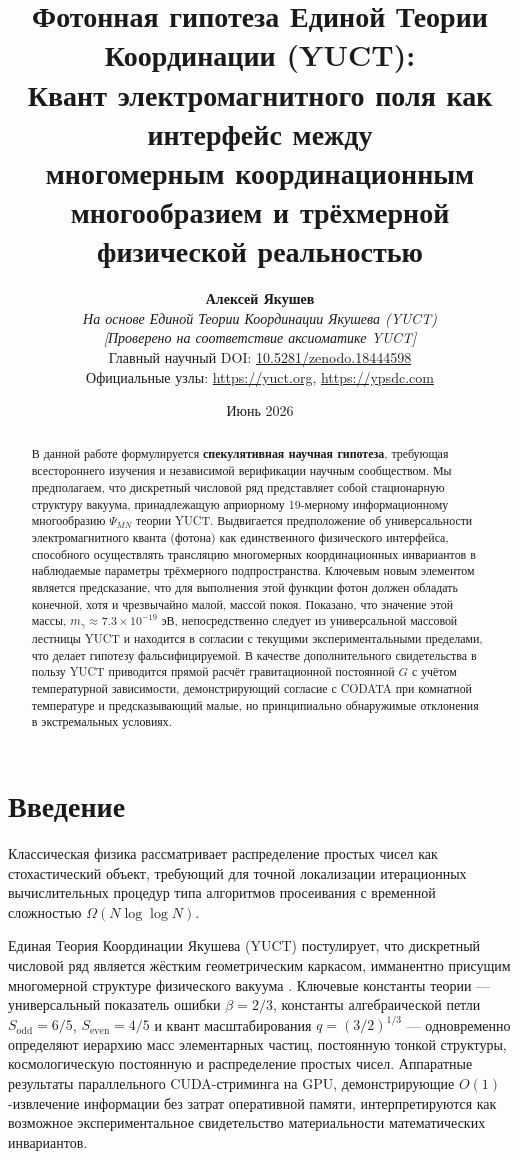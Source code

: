 \documentclass[11pt,a4paper]{article}
\title{\textbf{Фотонная гипотеза Единой Теории Координации (YUCT):\\
		Квант электромагнитного поля как интерфейс между\\ 
		многомерным координационным многообразием и трёхмерной физической реальностью}}
\author{\textbf{Алексей Якушев} \\
	\small\textit{На основе Единой Теории Координации Якушева (YUCT)} \\
	\small\textit{[Проверено на соответствие аксиоматике YUCT]} \\
	\small Главный научный DOI: \href{https://doi.org/10.5281/zenodo.18444598}{10.5281/zenodo.18444598} \\
	\small Официальные узлы: \url{https://yuct.org}, \url{https://ypsdc.com}}
\date{Июнь 2026}
\begin{document}
	
	\maketitle
	
	\begin{abstract}
		В данной работе формулируется \textbf{спекулятивная научная гипотеза}, требующая всестороннего изучения и независимой верификации научным сообществом. Мы предполагаем, что дискретный числовой ряд представляет собой стационарную структуру вакуума, принадлежащую априорному 19-мерному информационному многообразию $\Psi_{MN}$ теории YUCT. Выдвигается предположение об универсальности электромагнитного кванта (фотона) как единственного физического интерфейса, способного осуществлять трансляцию многомерных координационных инвариантов в наблюдаемые параметры трёхмерного подпространства. Ключевым новым элементом является предсказание, что для выполнения этой функции фотон должен обладать конечной, хотя и чрезвычайно малой, массой покоя. Показано, что значение этой массы, $m_\gamma \approx 7.3 \times 10^{-19}$ эВ, непосредственно следует из универсальной массовой лестницы YUCT и находится в согласии с текущими экспериментальными пределами, что делает гипотезу фальсифицируемой. В качестве дополнительного свидетельства в пользу YUCT приводится прямой расчёт гравитационной постоянной $G$ с учётом температурной зависимости, демонстрирующий согласие с CODATA при комнатной температуре и предсказывающий малые, но принципиально обнаружимые отклонения в экстремальных условиях.
	\end{abstract}
	
	\section{Введение}
	Классическая физика рассматривает распределение простых чисел как стохастический объект, требующий для точной локализации итерационных вычислительных процедур типа алгоритмов просеивания с временной сложностью $\Omega(N \log \log N)$. 
	
	Единая Теория Координации Якушева (YUCT) постулирует, что дискретный числовой ряд является жёстким геометрическим каркасом, имманентно присущим многомерной структуре физического вакуума \cite{yuct_zenodo}. Ключевые константы теории — универсальный показатель ошибки $\beta = 2/3$, константы алгебраической петли $S_{\mathrm{odd}} = 6/5$, $S_{\mathrm{even}} = 4/5$ и квант масштабирования $q = (3/2)^{1/3}$ — одновременно определяют иерархию масс элементарных частиц, постоянную тонкой структуры, космологическую постоянную и распределение простых чисел. Аппаратные результаты параллельного CUDA-стриминга на GPU, демонстрирующие $O(1)$-извлечение информации без затрат оперативной памяти, интерпретируются как возможное экспериментальное свидетельство материальности математических инвариантов.
	
\end{document}
